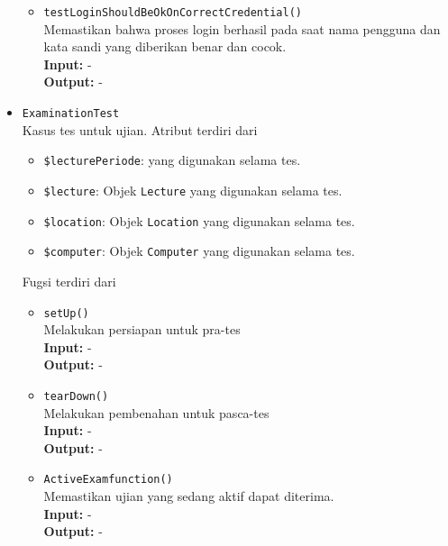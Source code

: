 \begin{itemize}
\begin{itemize}
                \item \texttt{testLoginShouldBeOkOnCorrectCredential()} \\
                    Memastikan bahwa proses login berhasil pada saat nama
                    pengguna dan kata sandi yang diberikan benar dan cocok.\\
                    \textbf{Input:} - \\
                    \textbf{Output:} -
            \end{itemize}
            
            \item \texttt{ExaminationTest} \\
                Kasus tes untuk ujian. Atribut terdiri dari
                \begin{itemize}
                    \item \texttt{\$lecturePeriode}:  yang digunakan selama tes.
                    \item \texttt{\$lecture}: Objek \texttt{Lecture} yang
                    digunakan selama tes.
                    \item \texttt{\$location}: Objek \texttt{Location} yang
                    digunakan selama tes.
                    \item \texttt{\$computer}: Objek \texttt{Computer} yang
                    digunakan selama tes.
                \end{itemize}
                Fugsi terdiri dari
                \begin{itemize}
                    \item \texttt{setUp()} \\
                        Melakukan persiapan untuk pra-tes \\
                        \textbf{Input:} -\\
                        \textbf{Output:} -
                    
                    \item \texttt{tearDown()} \\
                        Melakukan pembenahan untuk pasca-tes \\
                        \textbf{Input:} - \\
                        \textbf{Output:} -
                        
                    \item \texttt{ActiveExamfunction()} \\
                        Memastikan ujian yang sedang aktif dapat diterima. \\
                        \textbf{Input:} - \\
                        \textbf{Output:} -
                        

\end{itemize}
\end{itemize}
